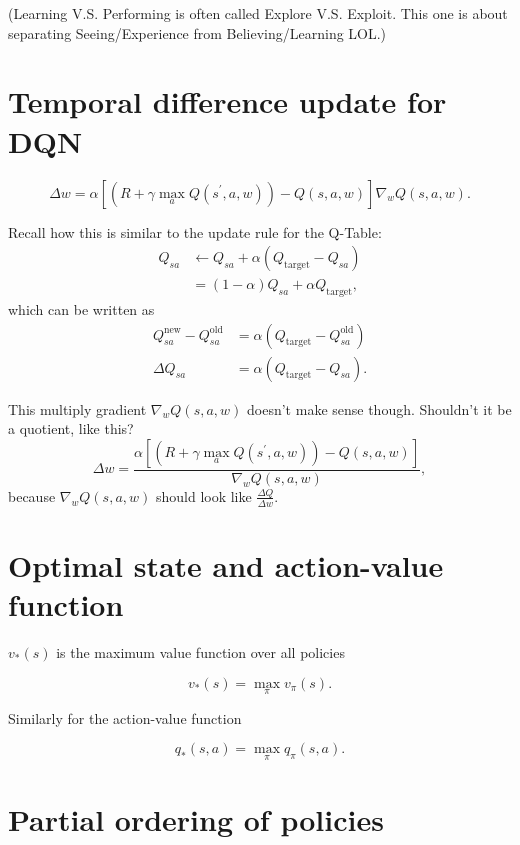 \documentclass[12pt]{article}
\theoremstyle{plain}
\theoremstyle{definition}
\theoremstyle{remark}
\begin{document}
(Learning V.S. Performing is often called Explore V.S. Exploit. This one is about separating Seeing/Experience from Believing/Learning LOL.)

\section{Temporal difference update for DQN}

$$
\Delta w = \alpha \left[ \left( R + \gamma \max _ { a } Q \left( s ^ { \prime } , a , w \right) \right) - Q ( s , a , w ) \right] \nabla _ { w } Q ( s , a , w ).
$$

Recall how this is similar to the update rule for the Q-Table:
\begin{align*}
Q_{sa} &\gets Q_{sa} + \alpha (Q_{\text{target}} - Q_{sa}) \\
&= (1 - \alpha) Q_{sa} + \alpha Q_{\text{target}},
\end{align*}
which can be written as
\begin{align*}
Q^{\text{new}}_{sa} - Q^{\text{old}}_{sa} &= \alpha (Q_{\text{target}} - Q^{\text{old}}_{sa}) \\
\Delta Q_{sa} &= \alpha (Q_{\text{target}} - Q_{sa}).
\end{align*}

This multiply gradient $ \nabla _ { w } Q ( s , a , w ) $ doesn't make sense though. Shouldn't it be a quotient, like this?
$$
\Delta w = \frac{\alpha \left[ \left( R + \gamma \max _ { a } Q \left( s ^ { \prime } , a , w \right) \right) - Q ( s , a , w ) \right]}{\nabla _ { w } Q ( s , a , w )},
$$
because $ \nabla _ { w } Q ( s , a , w ) $ should look like $ \frac{\Delta Q }{\Delta w}. $

\section{Optimal state and action-value function}

\( v _ { * } ( s ) \) is the maximum value function over all policies

\[
v _ { * } ( s ) = \max _ { \pi } v _ { \pi } ( s ).
\]

Similarly for the action-value function

\[
q _ { * } ( s , a ) = \max _ { \pi } q _ { \pi } ( s , a ).
\]

\section{Partial ordering of policies}
\end{document}
